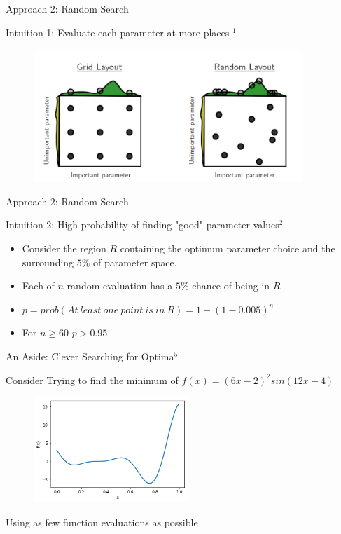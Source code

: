 \documentclass{beamer}
\begin{document}
\begin{frame}{Approach 2: Random Search}
	\begin{block}{Intuition 1: Evaluate each parameter at more places $^1$}
		\begin{figure}[h]
		\begin{center}
			\includegraphics[height=5cm]{gris_random_bergstra}
		\end{center}
	\end{figure}
	\end{block}
\end{frame}

\begin{frame}{Approach 2: Random Search}
	\begin{block}{Intuition 2: High probability of finding "good" parameter values$^2$}
\begin{itemize}
	\item Consider the region $R$ containing the optimum parameter choice and the surrounding $5\%$ of parameter space.
	\item Each of $n$ random evaluation has a $5\%$ chance of being in $R$
	\item $p=prob(At\  least\ one\ point\ is\ in\ R)=1-(1-0.005)^n$
	\item For $n\geq60$ $p>0.95$
\end{itemize}
	\end{block}
\end{frame}

\begin{frame}{An Aside: Clever Searching for Optima$^5$}
	\begin{block}{}
		Consider Trying to find the minimum of $f(x)=(6x-2)^2sin(12x-4)$
		
	
	\begin{figure}[h]
		\begin{center}
			\includegraphics[height=4cm]{forest}
		\end{center}
	\end{figure}
Using as few function evaluations as possible
	\end{block}
\end{frame}
\end{document}
